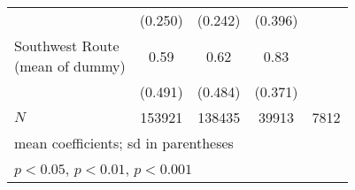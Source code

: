 \begin{table}[htbp]
\begin{tabular}{l*{4}{c}}
            &     (0.250)         &     (0.242)         &     (0.396)         &                     \\
[1em]
\Centerstack{Southwest Route \\ (mean of dummy)}&        0.59         &        0.62         &        0.83         &                     \\
            &     (0.491)         &     (0.484)         &     (0.371)         &                     \\
\hline
\(N\)       &      153921         &      138435         &       39913         &        7812         \\
\hline\hline
\multicolumn{5}{l}{\footnotesize mean coefficients; sd in parentheses}\\
\multicolumn{5}{l}{\footnotesize \sym{*} \(p<0.05\), \sym{**} \(p<0.01\), \sym{***} \(p<0.001\)}\\
\end{tabular}
\end{table}
